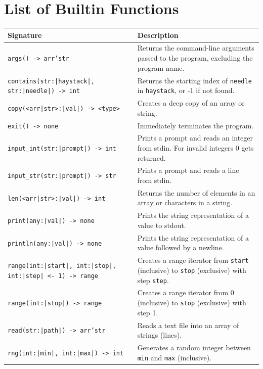 \documentclass[11pt,a4paper]{article}
\begin{document}
\section{List of Builtin Functions}

\vspace{1em}
\renewcommand{\arraystretch}{1.4}
\begin{xltabular}{\textwidth}{|>{\raggedright\arraybackslash}p{6.5cm} | X|}
  \hline
  \textbf{Signature} & \textbf{Description} \\ [0.5ex]
  \hline\hline
  \endhead
  \texttt{args() -> arr'str} & Returns the command-line arguments passed to the program, excluding the program name. \\
  \hline
  \texttt{contains(str:|haystack|, str:|needle|) -> int} & Returns the starting index of \texttt{needle} in \texttt{haystack}, or -1 if not found. \\
  \hline
  \texttt{copy(<arr|str>:|val|) -> <type>} & Creates a deep copy of an array or string. \\
  \hline
  \texttt{exit() -> none} & Immediately terminates the program. \\
  \hline
  \texttt{input\_int(str:|prompt|) -> int} & Prints a prompt and reads an integer from stdin. For invalid integers 0 gets returned. \\
  \hline
  \texttt{input\_str(str:|prompt|) -> str} & Prints a prompt and reads a line from stdin. \\
  \hline
  \texttt{len(<arr|str>:|val|) -> int} & Returns the number of elements in an array or characters in a string. \\
  \hline
  \texttt{print(any:|val|) -> none} & Prints the string representation of a value to stdout. \\
  \hline
  \texttt{println(any:|val|) -> none} & Prints the string representation of a value followed by a newline. \\
  \hline
  \texttt{range(int:|start|, int:|stop|, int:|step| <- 1) -> range} & Creates a range iterator from \texttt{start} (inclusive) to \texttt{stop} (exclusive) with step \texttt{step}. \\
  \hline
  \texttt{range(int:|stop|) -> range} & Creates a range iterator from 0  (inclusive) to \texttt{stop} (exclusive) with step 1. \\
  \hline
  \texttt{read(str:|path|) -> arr'str} & Reads a text file into an array of strings (lines). \\
  \hline
  \texttt{rng(int:|min|, int:|max|) -> int} & Generates a random integer between \texttt{min} and \texttt{max} (inclusive). \\

\end{xltabular}
\end{document}
